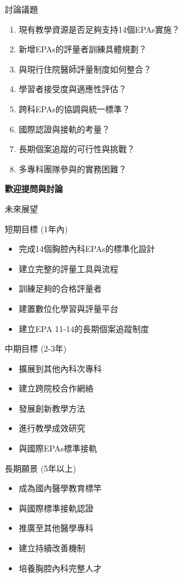\documentclass[aspectratio=169]{beamer}
\begin{document}
\begin{frame}{討論議題}
\begin{enumerate}
\item 現有教學資源是否足夠支持14個EPAs實施？
\item 新增EPAs的評量者訓練具體規劃？
\item 與現行住院醫師評量制度如何整合？
\item 學習者接受度與適應性評估？
\item 跨科EPAs的協調與統一標準？
\item 國際認證與接軌的考量？
\item \textcolor{emergency_red}{長期個案追蹤的可行性與挑戰？}
\item \textcolor{emergency_red}{多專科團隊參與的實務困難？}
\end{enumerate}

\vspace{1cm}
\begin{center}
\Large{\textcolor{emergency_blue}{\textbf{歡迎提問與討論}}}
\end{center}
\end{frame}

\begin{frame}{未來展望}
\begin{alertblock}{短期目標 (1年內)}
\begin{itemize}
\item 完成14個胸腔內科EPAs的標準化設計
\item 建立完整的評量工具與流程
\item 訓練足夠的合格評量者
\item 建置數位化學習與評量平台
\item 建立EPA 11-14的長期個案追蹤制度
\end{itemize}
\end{alertblock}

\begin{block}{中期目標 (2-3年)}
\begin{itemize}
\item 擴展到其他內科次專科
\item 建立跨院校合作網絡
\item 發展創新教學方法
\item 進行教學成效研究
\item 與國際EPAs標準接軌
\end{itemize}
\end{block}

\begin{exampleblock}{長期願景 (5年以上)}
\begin{itemize}
\item 成為國內醫學教育標竿
\item 與國際標準接軌認證
\item 推廣至其他醫學專科
\item 建立持續改善機制
\item 培養胸腔內科完整人才
\end{itemize}
\end{exampleblock}
\end{frame}
\end{document}
